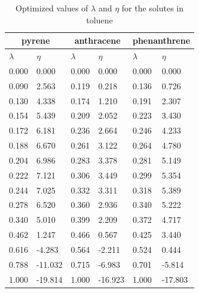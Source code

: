 \documentclass[
	12pt,				%
	openany,			%
	oneside,			%
	a4paper,			%
	english,			%
	brazil				%
	]{abntex2}
\begin{document}
\begin{apendicesenv}
\begin{table}[h]
	\centering
	\caption{Optimized values of $\lambda$ and $\eta$ for the solutes in toluene}
	\begin{tabular}{llllll}
		\hline
		\multicolumn{2}{c}{pyrene}& \multicolumn{2}{c}{anthracene}& \multicolumn{2}{c}{phenanthrene}\\
		\hline
		$\lambda$ & $\eta$ & $\lambda$ & $\eta$  & $\lambda$ & $\eta$   \\ 
		\hline
0.000	&	0.000	&	0.000	&	0.000	&	0.000	&	0.000	\\
0.090	&	2.563	&	0.119	&	0.218	&	0.136	&	0.726	\\
0.130	&	4.338	&	0.174	&	1.210	&	0.191	&	2.307	\\
0.154	&	5.439	&	0.209	&	2.052	&	0.223	&	3.430	\\
0.172	&	6.181	&	0.236	&	2.664	&	0.246	&	4.233	\\
0.188	&	6.670	&	0.261	&	3.122	&	0.264	&	4.780	\\
0.204	&	6.986	&	0.283	&	3.378	&	0.281	&	5.149	\\
0.222	&	7.121	&	0.306	&	3.449	&	0.299	&	5.354	\\
0.244	&	7.025	&	0.332	&	3.311	&	0.318	&	5.389	\\
0.278	&	6.520	&	0.360	&	2.936	&	0.340	&	5.222	\\
0.340	&	5.010	&	0.399	&	2.209	&	0.372	&	4.717	\\
0.462	&	1.247	&	0.466	&	0.567	&	0.425	&	3.440	\\
0.616	&	-4.283	&	0.564	&	-2.211	&	0.524	&	0.444	\\
0.788	&	-11.032	&	0.715	&	-6.983	&	0.701	&	-5.814	\\
1.000	&	-19.814	&	1.000	&	-16.923	&	1.000	&	-17.803	\\

		\hline
	\end{tabular}
\end{table}


\end{apendicesenv}
\end{document}
